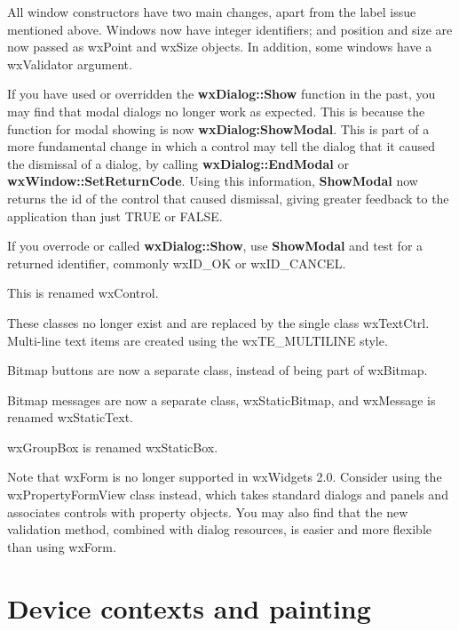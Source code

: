 
All window constructors have two main changes, apart from the label issue mentioned above.
Windows now have integer identifiers; and position and size are now passed as wxPoint and
wxSize objects. In addition, some windows have a wxValidator argument.


If you have used or overridden the {\bf wxDialog::Show} function in the past, you may find
that modal dialogs no longer work as expected. This is because the function for modal showing
is now {\bf wxDialog:ShowModal}. This is part of a more fundamental change in which a
control may tell the dialog that it caused the dismissal of a dialog, by
calling {\bf wxDialog::EndModal} or {\bf wxWindow::SetReturnCode}. Using this
information, {\bf ShowModal} now returns the id of the control that caused dismissal,
giving greater feedback to the application than just TRUE or FALSE.

If you overrode or called {\bf wxDialog::Show}, use {\bf ShowModal} and test for a returned identifier,
commonly wxID\_OK or wxID\_CANCEL.


This is renamed wxControl.


These classes no longer exist and are replaced by the single class wxTextCtrl.
Multi-line text items are created using the wxTE\_MULTILINE style.


Bitmap buttons are now a separate class, instead of being part of wxBitmap.


Bitmap messages are now a separate class, wxStaticBitmap, and wxMessage
is renamed wxStaticText.


wxGroupBox is renamed wxStaticBox.


Note that wxForm is no longer supported in wxWidgets 2.0. Consider using the wxPropertyFormView class
instead, which takes standard dialogs and panels and associates controls with property objects.
You may also find that the new validation method, combined with dialog resources, is easier
and more flexible than using wxForm.

\section{Device contexts and painting}\label{portingdc}

